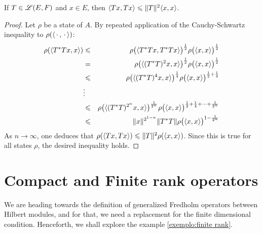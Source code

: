 \begin{proposicao}
    If $T \in \mathscr L(E,F)$ and $x\in E$, then $\langle {Tx},{Tx}\rangle \leqslant \|T\|^2 \langle {x},{x}\rangle$.
    \begin{proof}
    Let $\rho$ be a state of $A$. By repeated application of the Cauchy-Schwartz inequality to $\rho(\langle {\operatorname{\,\cdot\,}},{\operatorname{\,\cdot\,}}\rangle)$:
    \begin{eqnarray*}
    \rho(\langle {T^*Tx},{x}\rangle) &\leqslant& \rho\big(\langle {T^*Tx},{T^*Tx}\rangle\big)^{\frac12} \rho\big(\langle {x},{x}\rangle\big)^{\frac12} \\
    &=&
    \rho\big(\langle {(T^*T)^2x},{x}\rangle\big)^{\frac12} \rho\big(\langle {x},{x}\rangle\big)^{\frac12} \\
    &\leqslant& 
    \rho\big(\langle {(T^*T)^4x},{x}\rangle\big)^{\frac14} \rho\big(\langle {x},{x}\rangle\big)^{\frac12 + \frac14} \\
    &\vdots&  \\
    &\leqslant& 
    \rho\big(\langle {(T^*T)^{2^n}x},{x}\rangle\big)^{\frac1{2^n}} \rho\big(\langle {x},{x}\rangle\big)^{\frac12 + \frac14+ \cdots + \frac1{2^n}} \\
    &\leqslant& 
    \|x\|^{2^{1-n}} \|T^*T\| \rho\big(\langle {x},{x}\rangle\big)^{1 - \frac1{2^n}} 
    \end{eqnarray*}
    As $n\to \infty$, one deduces that $\rho(\langle {Tx},{Tx}\rangle) \leqslant \|T\|^2 \rho(\langle {x},{x}\rangle)$. Since this is true for all states $\rho$, the desired inequality holds.
    \end{proof}
\end{proposicao}
    
\section{Compact and Finite rank operators}
\label{sec: finite rank operators}

We are heading towards the definition of generalized Fredholm operators between Hilbert modules, and for that, we need a replacement for the finite dimensional condition. Henceforth, we shall explore the example \ref{exemplo:finite rank}.

